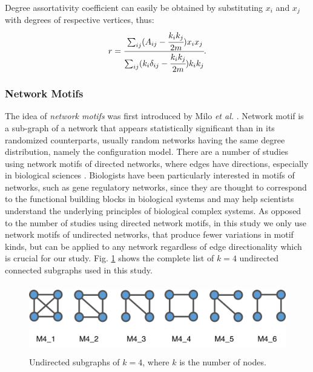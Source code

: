 \documentclass{article}
\begin{document}
Degree assortativity coefficient can easily be obtained by substituting $x_i$ and $x_j$ with degrees of respective vertices, thus:
	\begin{equation}
	 r =  \cfrac{\sum_{ij}(A_{ij} - \cfrac{k_i k_j}{2m})x_i x_j}{\sum_{ij}(k_i \delta_{ij} - \cfrac{k_i k_j}{2m}) k_i k_j}.
	\end{equation}

	\subsubsection{Network Motifs} 
The idea of \textit{network motifs} was first introduced by Milo \textit{et al.} \cite{Milo_motif}. Network motif is a sub-graph of a network that appears statistically significant than in its randomized counterparts, usually random networks having the same degree distribution, namely the configuration model. There are a number of studies using network motifs of directed networks, where edges have directions, especially in biological sciences \cite{Alon2007, MotifsInBrain, NetworkMotifsEcoli}. Biologists have been particularly interested in motifs of networks, such as gene regulatory networks, since they are thought to correspond to the functional building blocks in biological systems and may help scientists understand the underlying principles of biological complex systems.
As opposed to the number of studies using directed network motifs, in this study we only use network motifs of undirected networks, that produce fewer variations in motif kinds, but can be applied to any network regardless of edge directionality which is crucial for our study. Fig. \ref{motifs} shows the complete list of $k=4$ undirected connected subgraphs used in this study.

\begin{figure}[ht]
	\begin{center}
		\vspace{0.5cm}
		\includegraphics[clip,width=12cm,height = 3cm]{figs/motifs.png}
		\vspace{0.5cm}
		\caption{Undirected subgraphs of $k =4$, where $k$ is the number of nodes.}
		\label{motifs}
	\end{center}
\end{figure}
\end{document}
